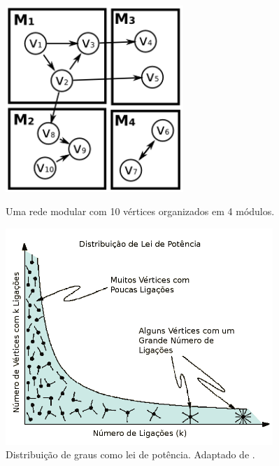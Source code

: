 \documentclass[12pt]{article}
\begin{document}
\begin{figure}[ht]
\begin{minipage}[b]{0.5\linewidth}
\centering
\includegraphics[width=0.6\textwidth]{rede-modular} 
\caption{Uma rede modular com 10 vértices organizados em 4 módulos.} 
\label{fig:rede-modular}
\end{minipage}
\hspace{0.5cm}
\begin{minipage}[b]{0.5\linewidth}
\centering
\includegraphics[width=0.9\textwidth]{leidepotencia}
\caption{Distribuição de graus como lei de potência. Adaptado de 
\cite{Barabasi2007}.} 
\label{fig:leidepotencia}
\end{minipage}
\end{figure}

%
\end{document}

